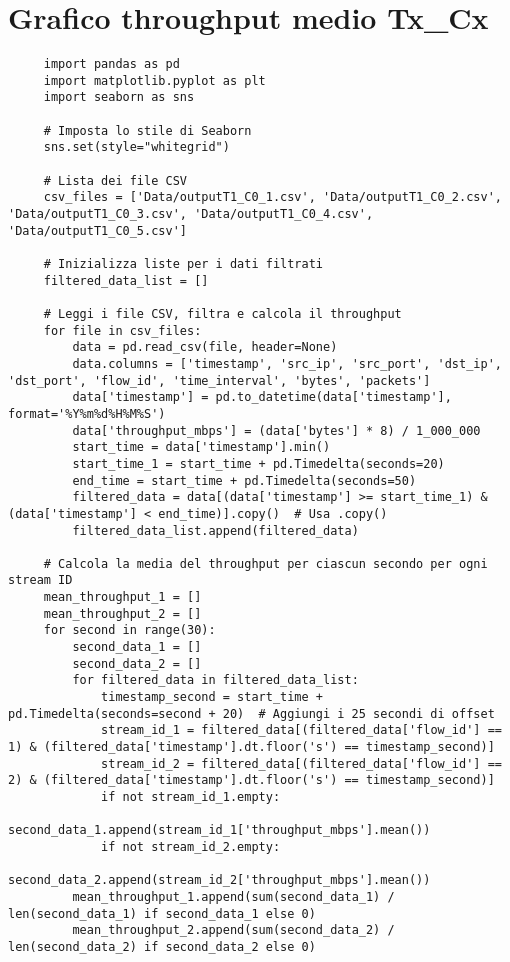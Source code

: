 \section{Grafico throughput medio Tx\_Cx}
\label{plot_test1}
\begin{lstlisting}
     import pandas as pd
     import matplotlib.pyplot as plt
     import seaborn as sns
     
     # Imposta lo stile di Seaborn
     sns.set(style="whitegrid")
     
     # Lista dei file CSV
     csv_files = ['Data/outputT1_C0_1.csv', 'Data/outputT1_C0_2.csv', 'Data/outputT1_C0_3.csv', 'Data/outputT1_C0_4.csv', 'Data/outputT1_C0_5.csv']
     
     # Inizializza liste per i dati filtrati
     filtered_data_list = []
     
     # Leggi i file CSV, filtra e calcola il throughput
     for file in csv_files:
         data = pd.read_csv(file, header=None)
         data.columns = ['timestamp', 'src_ip', 'src_port', 'dst_ip', 'dst_port', 'flow_id', 'time_interval', 'bytes', 'packets']
         data['timestamp'] = pd.to_datetime(data['timestamp'], format='%Y%m%d%H%M%S')
         data['throughput_mbps'] = (data['bytes'] * 8) / 1_000_000
         start_time = data['timestamp'].min()
         start_time_1 = start_time + pd.Timedelta(seconds=20)
         end_time = start_time + pd.Timedelta(seconds=50)
         filtered_data = data[(data['timestamp'] >= start_time_1) & (data['timestamp'] < end_time)].copy()  # Usa .copy()
         filtered_data_list.append(filtered_data)
     
     # Calcola la media del throughput per ciascun secondo per ogni stream ID
     mean_throughput_1 = []
     mean_throughput_2 = []
     for second in range(30):
         second_data_1 = []
         second_data_2 = []
         for filtered_data in filtered_data_list:
             timestamp_second = start_time + pd.Timedelta(seconds=second + 20)  # Aggiungi i 25 secondi di offset
             stream_id_1 = filtered_data[(filtered_data['flow_id'] == 1) & (filtered_data['timestamp'].dt.floor('s') == timestamp_second)]
             stream_id_2 = filtered_data[(filtered_data['flow_id'] == 2) & (filtered_data['timestamp'].dt.floor('s') == timestamp_second)]
             if not stream_id_1.empty:
                 second_data_1.append(stream_id_1['throughput_mbps'].mean())
             if not stream_id_2.empty:
                 second_data_2.append(stream_id_2['throughput_mbps'].mean())
         mean_throughput_1.append(sum(second_data_1) / len(second_data_1) if second_data_1 else 0)
         mean_throughput_2.append(sum(second_data_2) / len(second_data_2) if second_data_2 else 0)
     

\end{lstlisting}
